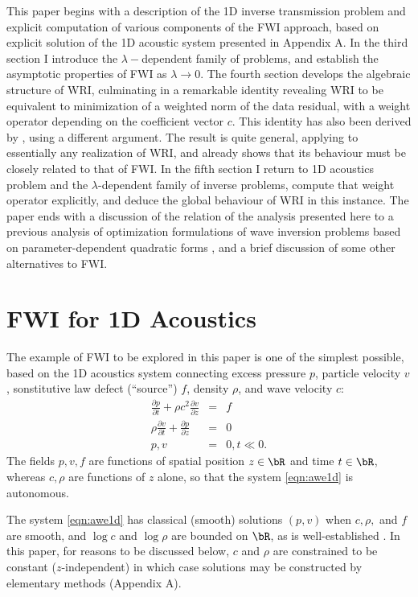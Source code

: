 This paper begins with a description of the 1D inverse transmission
problem and explicit computation of various components of the FWI
approach, based on explicit solution of the 1D acoustic system
presented in Appendix A. In the third section I introduce the $\lambda-$dependent
family of problems, and establish the asymptotic properties of FWI as
$\lambda \rightarrow 0$. The fourth section develops the algebraic
structure of WRI, culminating in a remarkable identity revealing WRI
to be equivalent to minimization of a weighted norm of the data
residual, with a weight operator depending on the coefficient vector
$c$. This identity has also been derived by \cite{Leeuwen2019note},
using a different argument. The result is quite general, applying to essentially any
realization of WRI, and already shows that its behaviour must be
closely related to that of FWI. In the fifth section I return to 
1D acoustics problem and the $\lambda$-dependent family of inverse
problems, compute that weight operator explicitly, and deduce the
global behaviour of WRI in this instance. The paper ends with a
discussion of the relation of the analysis presented here to a
previous analysis of optimization formulations of wave inversion
problems based on parameter-dependent quadratic forms
\cite[]{StolkSymes:03}, and a brief discussion of some other
alternatives to FWI.

\section{FWI for 1D Acoustics}
The example of FWI to be explored in this paper is one of the simplest possible, based on the 1D acoustics system connecting excess pressure $p$, particle velocity $v$, sonstitutive law defect (``source'') $f$, density $\rho$, and wave velocity $c$:
\begin{eqnarray}
\label{eqn:awe1d}
\frac{\partial p}{\partial t} + \rho c^2\frac{\partial 
  v}{\partial z} &=& f \nonumber\\
\rho \frac{\partial v}{\partial t} + \frac{\partial p}{\partial 
  z}&=&0\nonumber\\
 p,v&=&0, t \ll 0. 
\end{eqnarray}
The fields $p,v,f$ are functions of spatial position $z \in \bR$ and time $t \in \bR$, whereas $c, \rho$ are functions of $z$ alone, so that the system \ref{eqn:awe1d} is autonomous.

The system \ref{eqn:awe1d} has classical (smooth) solutions $(p,v)$
when $c, \rho,$ and $f$ are smooth, and $\log c$ and $\log \rho$ are
bounded on $\bR$, as is well-established \cite[]{Lax:PDENotes}. In
this paper, for reasons to be discussed below, $c$ and $\rho$ are
constrained to be constant ($z$-independent) in which case solutions
may be constructed by elementary methods (Appendix A). 

